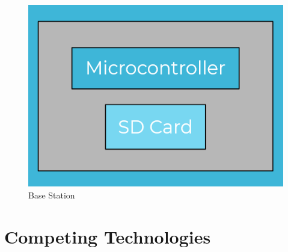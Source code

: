\documentclass[12pt]{article}         %
\begin{document}
\begin{figure}[h]
    \centering
    \includegraphics{fish}
    \caption{Base Station}
    \label{fig:my_label}
\end{figure}

\section{Competing Technologies}  %
\end{document}
